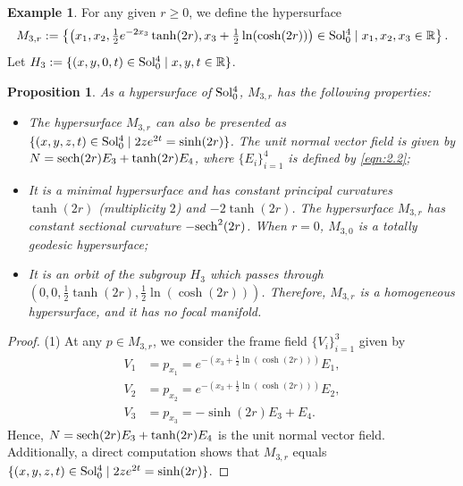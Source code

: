 \documentclass[reqno]{amsart}%
\newtheorem{proposition}[theorem]{Proposition}
\theoremstyle{definition}
\newtheorem{example}{Example}[section]  %
\numberwithin{equation}{section}
\begin{document}
	\begin{example}\label{exam:3.8}
		For any given $r\geq0$, we define the hypersurface
		$$
		M_{3,r}:=\left\{\left(x_1,x_2,\tfrac{1}{2}e^{-2x_3}\tanh(2r),x_3+\tfrac{1}{2}\ln(\cosh(2r))\right)\in {\rm Sol_0^4}
		\mid x_1,x_2,x_3\in \mathbb{R}\right\}.
		$$
		Let $H_3:=\{(x,y,0,t)\in {\rm Sol_0^4}\mid x,y,t\in \mathbb{R}\}$.
		\begin{proposition}\label{prop:M3r}
			As a hypersurface of ${\rm Sol_0^4}$, $M_{3,r}$ has the following properties:
			\begin{itemize}
				
				\vskip1mm
				\item[(1)]
				The hypersurface $M_{3,r}$ can also be presented as $\{(x,y,z,t)\in {\rm Sol_0^4}
				\mid  2ze^{2t}=\sinh (2r)\}$.  
				The unit normal vector field is given by $N={\rm sech}(2r)E_3+\tanh(2r)E_4$,
				where $\{E_i\}_{i=1}^4$ is defined by \eqref{eqn:2.2};
				
				\vskip1mm
				\item[(2)]
				It is a minimal hypersurface and has constant principal curvatures $\tanh(2r)$ (multiplicity $2$)
				and $-2\tanh(2r)$.
				The hypersurface $M_{3,r}$ has constant sectional curvature $-{\rm sech}^2 (2r)$.
				When $r=0$, $M_{3,0}$ is a totally geodesic hypersurface;
				
				\vskip1mm
				\item[(3)]
				It is an orbit of the subgroup $H_3$ which passes through
				$(0,0,\tfrac{1}{2}\tanh(2r),\tfrac{1}{2}\ln(\cosh(2r)))$.
				Therefore, $M_{3,r}$ is a homogeneous hypersurface,
				and it has no focal manifold.
			\end{itemize}
		\end{proposition}
		
		\begin{proof}
			(1) At any $p\in M_{3,r}$, we consider the frame field $\{V_i\}_{i=1}^3$ given by
			\begin{equation*}
				\begin{aligned}
					V_1&=p_{x_1}=e^{-\left(x_3+\tfrac{1}{2}\ln(\cosh(2r))\right)}E_1,\\
					V_2&=p_{x_2}=e^{-\left(x_3+\tfrac{1}{2}\ln(\cosh(2r))\right)}E_2,\\
					V_3&=p_{x_3}=-\sinh(2r)E_3+E_4.
				\end{aligned}
			\end{equation*}
			Hence, $N={\rm sech}(2r)E_3+\tanh(2r)E_4$ is the unit normal vector field.
			Additionally, a direct computation shows that $M_{3,r}$ equals $\{(x,y,z,t)\in {\rm Sol_0^4}
			\mid  2ze^{2t}=\sinh (2r)\}$.
			

\end{proof}
\end{example}
\end{document}
